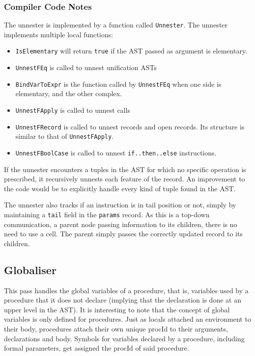 \documentclass[a4paper]{memoir}
\begin{document}
\subsubsection{Compiler Code Notes}
The unnester is implemented by a function called \lstinline!Unnester!. The unnester implements multiple local functions:
\begin{itemize}
  \item  \lstinline!IsElementary! will return \lstinline!true! if the AST passed as argument is elementary.
  \item  \lstinline!UnnestFEq! is called to unnest unification ASTs
  \item  \lstinline!BindVarToExpr! is the function called by \lstinline!UnnestFEq! when one side is elementary, and the other complex.
  \item  \lstinline!UnnestFApply! is called to unnest calls
  \item  \lstinline!UnnestFRecord! is called to unnest records and open records. Its structure is similar to that of \lstinline!UnnestFApply!.
  \item  \lstinline!UnnestFBoolCase! is called to unnest \lstinline!if..then..else! instructions.
\end{itemize}
If the unnester encounters a tuples in the AST for which no specific operation is prescribed, it recursively unnests each feature of the record.
An improvement to the code would be to explicitly handle every kind of tuple
found in the AST.

The unnester also tracks if an instruction is in tail position or not, simply by
maintaining a \lstinline!tail! field in the \lstinline!params! record. As this
is a top-down communication, a parent node passing information to its children,
there is no need to use a cell. The parent simply passes the correctly updated
record to its children.

\subsection{Globaliser}\label{sec:arch:globaliser}            
This pass handles the global variables of a procedure, that is, variables used
by a procedure that it does not declare (implying that the declaration is done
at an upper level in the AST). It is interesting to note that the concept of global variables is only defined for procedures.
Just as locals attached an environment to their body, procedures attach their own unique procId to their arguments, declarations and body.
Symbols for variables declared by a procedure, including formal parameters, get assigned the procId of said procedure.
\end{document}
